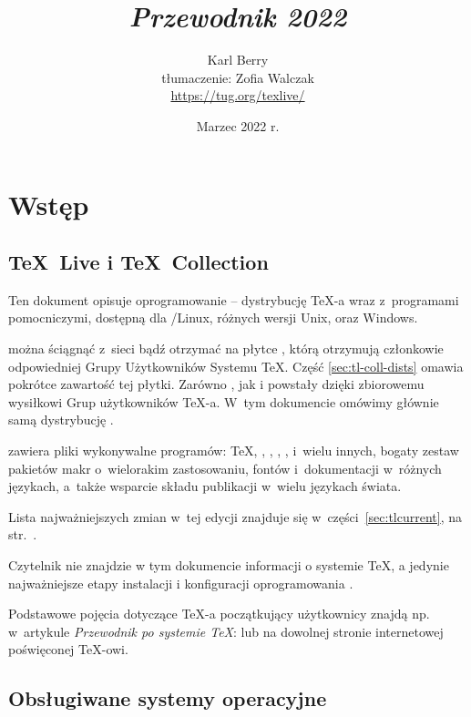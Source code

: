 \documentclass{article}
\title{%
 {\huge \textit{Przewodnik \protect\TL{} 2022}}
}
\author{Karl Berry\\[2mm]
 tłumaczenie: Zofia Walczak\\[2mm]
 \url{https://tug.org/texlive/}
}
\date{Marzec 2022 r.}
\begin{document}
\maketitle

\begin{multicols}{2}
\tableofcontents
\end{multicols}
\section{Wstęp}\label{sec:intro}

\subsection{\protect\TeX\protect\ Live i \protect\TeX\protect\ Collection}
Ten dokument  opisuje oprogramowanie \TL{} --
dystrybucję \TeX-a wraz z~programami pomocniczymi, dostępną dla \GNU/Linux,
różnych wersji Unix, \MacOSX oraz Windows.

\TL{} można ściągnąć z~sieci bądź otrzymać na płytce \DVD \TK{}, którą otrzymują członkowie odpowiedniej Grupy Użytkowników Systemu \TeX{}.
Część \ref{sec:tl-coll-dists} omawia pokrótce zawartość tej płytki.
Zarówno \TL{}, jak i \TK{} powstały dzięki zbiorowemu wysiłkowi Grup użytkowników \TeX-a.
W~tym dokumencie omówimy głównie samą dystrybucję \TL.

\TL{} zawiera pliki wykonywalne programów: \TeX{}, \LaTeXe{}, \ConTeXt,
\MF, \MP, \BibTeX{}
 i~wielu innych,  bogaty zestaw pakietów makr o~wielorakim
zastosowaniu,   fontów i~dokumentacji w~różnych językach, a~także  wsparcie składu
publikacji w~wielu językach świata.

Lista najważniejszych zmian w~tej edycji \TL{}
znajduje się w~części~\ref{sec:tlcurrent}, na str.~\pageref{sec:tlcurrent}.

Czytelnik nie znajdzie w tym dokumencie informacji o systemie \TeX{}, a jedynie najważniejsze etapy instalacji i konfiguracji oprogramowania \TL.


Podstawowe pojęcia dotyczące \TeX-a początkujący użytkownicy znajdą
np. w~artykule {\it Przewodnik po systemie \TeX\/}:
 lub na dowolnej stronie internetowej poświęconej \TeX-owi.

\subsection{Obsługiwane systemy operacyjne}
\label{sec:os_support}
\end{document}
